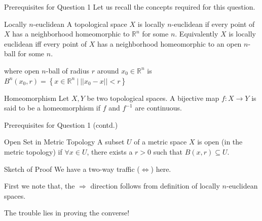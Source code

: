 \documentclass{beamer}
\begin{document}
\begin{frame}{Prerequisites for Question 1}
Let us recall the concepts required for this question.
\begin{block}{Locally $\displaystyle n$-euclidean}
A topological space $\displaystyle X$ is \alert{locally $n$-euclidean} if every point of $\displaystyle X$ has a neighborhood homeomorphic to $\displaystyle \mathbb{R}^{n}$ for some $\displaystyle n$.
Equivalently $\displaystyle X$ is locally euclidean iff every point of $\displaystyle X$ has a neighborhood homeomorphic to an open $\displaystyle n$-ball for some $\displaystyle n$.
\end{block} 
where open $\displaystyle n$-ball of radius $\displaystyle r$ around $\displaystyle x_{0} \in \mathbb{R}^{n}$ is $\displaystyle B^{n}( x_{0} ,r) =\left\{x\in \mathbb{R}^{n} \ |\ ||x_{0} -x||< r\right\}$ 
\begin{block}{Homeomorphism}
Let $\displaystyle X,Y$ be two topological spaces. A bijective map $\displaystyle f:X\rightarrow Y$ is said to be a \alert{homeomorphism} if $\displaystyle f$ and $\displaystyle f^{-1}$ are continuous. 
\end{block}
\end{frame}
\begin{frame}{Prerequisites for Question 1 (contd.)}
\begin{block}{Open Set in Metric Topology}
A subset $\displaystyle U$ of a metric space $\displaystyle X$ is open (in the metric topology) if $\displaystyle \forall x\in U$, there exists a $\displaystyle r >0$ such that $\displaystyle B( x,r) \subseteq U$.
\end{block}
\end{frame}
\begin{frame}{Sketch of Proof}
We have a two-way traffic ($\displaystyle \Leftrightarrow $) here. 

First we note that, the $\displaystyle \Rightarrow $ direction follows from definition of locally $\displaystyle n$-euclidean spaces. 

\alert{The trouble lies in proving the converse!}
\end{frame}
\end{document}

